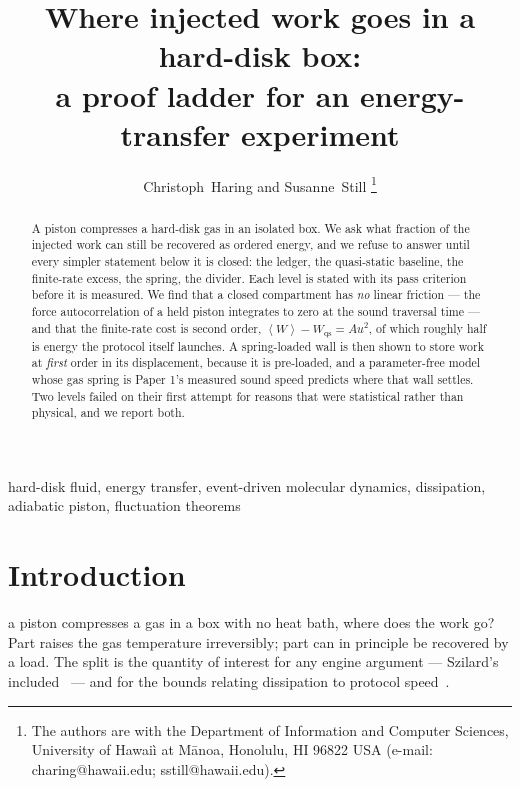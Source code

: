 \documentclass[journal]{IEEEtran}
\newcommand{\avg}[1]{\left\langle #1 \right\rangle}
\begin{document}
\title{Where injected work goes in a hard-disk box:\\
a proof ladder for an energy-transfer experiment}

\author{Christoph~Haring and Susanne~Still%
\thanks{The authors are with the Department of Information and Computer Sciences,
University of Hawai\`i at M\=anoa, Honolulu, HI 96822 USA
(e-mail: charing@hawaii.edu; sstill@hawaii.edu).}}

\maketitle

\begin{abstract}
A piston compresses a hard-disk gas in an isolated box. We ask what fraction of the injected work
can still be recovered as ordered energy, and we refuse to answer until every simpler statement
below it is closed: the ledger, the quasi-static baseline, the finite-rate excess, the spring, the
divider. Each level is stated with its pass criterion before it is measured. We find that a closed
compartment has \emph{no} linear friction --- the force autocorrelation of a held piston integrates
to zero at the sound traversal time --- and that the finite-rate cost is second order,
$\avg W - W_{\mathrm{qs}} = Au^2$, of which roughly half is energy the protocol itself launches.
A spring-loaded wall is then shown to store work at \emph{first} order in its displacement, because
it is pre-loaded, and a parameter-free model whose gas spring is Paper 1's measured sound speed
predicts where that wall settles. Two levels failed on their first attempt for reasons that were
statistical rather than physical, and we report both.
\end{abstract}

\begin{IEEEkeywords}
hard-disk fluid, energy transfer, event-driven molecular dynamics, dissipation, adiabatic piston,
fluctuation theorems
\end{IEEEkeywords}

\section{Introduction}
 a piston compresses a gas in a box with no heat bath, where does the work go?
Part raises the gas temperature irreversibly; part can in principle be recovered by a load. The
split is the quantity of interest for any engine argument --- Szilard's included~\cite{szilard1929}
--- and for the bounds relating dissipation to protocol speed~\cite{jarzynski1997,sivak2012}.
\end{document}
